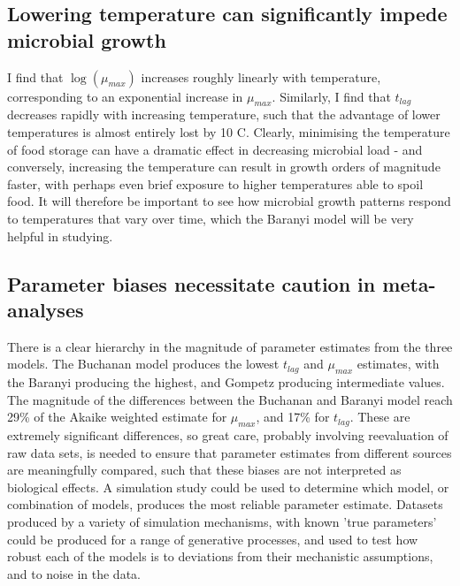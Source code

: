\documentclass[11pt, a4paper]{article}
\begin{document}
\begin{linenumbers}
\begin{enumerate}
 \end{enumerate}

\subsection{Lowering temperature can significantly impede microbial growth}

I find that $\log(\mu_{max})$ increases roughly linearly with temperature, corresponding to an exponential increase in $\mu_{max}$. Similarly, I find that $t_{lag}$ decreases rapidly with increasing temperature, such that the advantage of lower temperatures is almost entirely lost by 10 \degree C. Clearly, minimising the temperature of food storage can have a dramatic effect in decreasing microbial load - and conversely, increasing the temperature can result in growth orders of magnitude faster, with perhaps even brief exposure to higher temperatures able to spoil food. It will therefore be important to see how microbial growth patterns respond to temperatures that vary over time, which the Baranyi model will be very helpful in studying.

\subsection{Parameter biases necessitate caution in meta-analyses}

There is a clear hierarchy in the magnitude of parameter estimates from the three models. The Buchanan model produces the lowest $t_{lag}$ and $\mu_{max}$ estimates, with the Baranyi producing the highest, and Gompetz producing intermediate values. The magnitude of the differences between the Buchanan and Baranyi model reach 29\% of the Akaike weighted estimate for $\mu_{max}$, and 17\% for $t_{lag}$. These are extremely significant differences, so great care, probably involving reevaluation of raw data sets, is needed to ensure that parameter estimates from different sources are meaningfully compared, such that these biases are not interpreted as biological effects. A simulation study could be used to determine which model, or combination of models, produces the most reliable parameter estimate. Datasets produced by a variety of simulation mechanisms, with known 'true parameters' could be produced for a range of generative processes, and used to test how robust each of the models is to deviations from their mechanistic assumptions, and to noise in the data.


\end{linenumbers}
\end{document}
